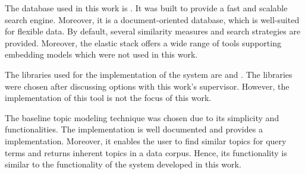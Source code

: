 The database used in this work is \databaseName{}.
It was built to provide a fast and scalable search engine.
Moreover, it is a document-oriented database, which is well-suited for flexible data.
By default, several similarity measures and search strategies are provided.
Moreover, the elastic stack offers a wide range of tools supporting embedding models which were not used in this work.


The libraries used for the implementation of the system are \angular{} and \flask{}.
The libraries were chosen after discussing options with this work's supervisor.
However, the implementation of this tool is not the focus of this work.

The baseline topic modeling technique \topTwovec{} was chosen due to its simplicity and functionalities.
The \topTwovec{} implementation is well documented and provides a \wordcloud{} implementation.
Moreover, it enables the user to find similar topics for query terms and returns inherent topics in a data corpus.
Hence, its functionality is similar to the functionality of the system developed in this work.